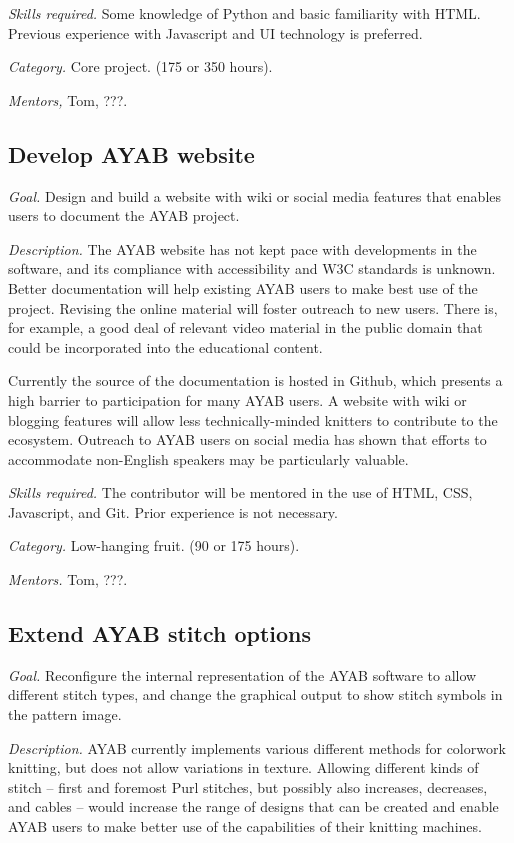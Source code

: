 \documentclass{article}
\begin{document}
\textit{Skills required.} Some knowledge of Python and basic familiarity with HTML. Previous experience with Javascript and UI technology is preferred.

\textit{Category.} Core project. (175 or 350 hours).

\textit{Mentors,} Tom, ???.


\subsection{Develop AYAB website} 

\textit{Goal.} Design and build a website with wiki or social media features that enables users to document the AYAB project. 

\textit{Description.} The AYAB website has not kept pace with developments in the software, and its compliance with accessibility and W3C standards is unknown. Better documentation will help existing AYAB users to make best use of the project. Revising the online material will foster outreach to new users. There is, for example, a good deal of relevant video material in the public domain that could be incorporated into the educational content.

Currently the source of the documentation is hosted in Github, which presents a high barrier to participation for many AYAB users. A website with wiki or blogging features will allow less technically-minded knitters to contribute to the ecosystem. Outreach to AYAB users on social media has shown that efforts to accommodate non-English speakers may be particularly valuable.

\textit{Skills required.} The contributor will be mentored in the use of HTML, CSS, Javascript, and Git. Prior experience is not necessary.

\textit{Category.} Low-hanging fruit. (90 or 175 hours).

\textit{Mentors.} Tom, ???.


\subsection{Extend AYAB stitch options} 

\textit{Goal.} Reconfigure the internal representation of the AYAB software to allow different stitch types, and change the graphical output to show stitch symbols in the pattern image.

\textit{Description.} AYAB currently implements various different methods for colorwork knitting, but does not allow variations in texture. Allowing different kinds of stitch -- first and foremost Purl stitches, but possibly also increases, decreases, and cables -- would increase the range of designs that can be created and enable AYAB users to make better use of the capabilities of their knitting machines.
\end{document}
